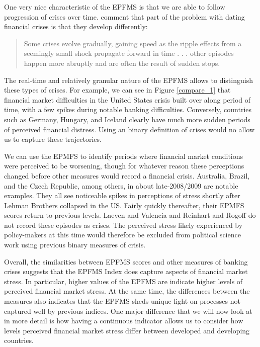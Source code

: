 \documentclass[]{article}
\begin{document}
One very nice characteristic of the EPFMS is that we are able to follow
progression of crises over time. \cite[227]{laeven2013} comment
that part of the problem with dating financial crises is that they
develop differently:

\begin{quote}
    Some crises evolve gradually, gaining speed as the ripple effects from a seemingly small shock propagate forward in time . . . other episodes happen more abruptly and are often the result of sudden stops.
\end{quote}

The real-time and relatively granular nature of the EPFMS allows to
distinguish these types of crises. For example, we can see in Figure
\ref{compare_1} that financial market difficulties in the United States
crisis built over along period of time, with a few spikes during notable
banking difficulties. Conversely, countries such as Germany, Hungary,
and Iceland clearly have much more sudden periods of perceived financial
distress. Using an binary definition of crises would no allow us to
capture these trajectories.

We can use the EPMFS to identify periods where financial market
conditions were perceived to be worsening, though for whatever reason
these perceptions changed before other measures would record a financial
crisis. Australia, Brazil, and the Czech Republic, among others, in
about late-2008/2009 are notable examples. They all see noticeable
spikes in perceptions of stress shortly after Lehman Brothers collapsed
in the US. Fairly quickly thereafter, their EPMFS scores return to
previous levels. Laeven and Valencia and Reinhart and Rogoff do not
record these episodes as crises. The perceived stress likely experienced
by policy-makers at this time would therefore be excluded from political
science work using previous binary measures of crisis.

Overall, the similarities between EPFMS scores and other measures of
banking crises suggests that the EPFMS Index does capture aspects of
financial market stress. In particular, higher values of the EPFMS are
indicate higher levels of perceived financial market stress. At the same
time, the differences between the measures also indicates that the EPFMS
sheds unique light on processes not captured well by previous indices.
One major difference that we will now look at in more detail is how
having a continuous indicator allows us to consider how levels perceived
financial market stress differ between developed and developing
countries.
\end{document}

